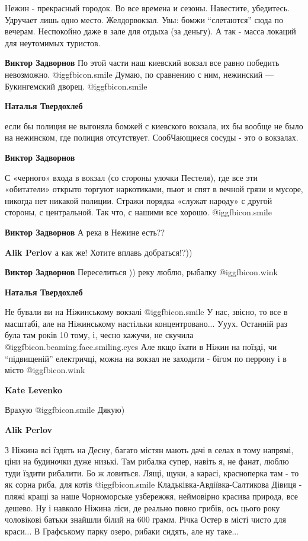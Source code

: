 \begin{itemize}
\begin{itemize}
\begin{itemize}
Нежин - прекрасный городок. Во все времена и сезоны. Навестите, убедитесь.
Удручает лишь одно место. Желдорвокзал. Увы: бомжи \enquote{слетаются} сюда по вечерам.
Неспокойно даже в зале для отдыха (за деньгу). А так - масса локаций для
неутомимых туристов.

\textbf{Виктор Задворнов} По этой части наш киевский вокзал все равно победить невозможно.  @igg{fbicon.smile} Думаю, по сравнению с ним, нежинский — Букингемский дворец.  @igg{fbicon.smile} 

\textbf{Наталья Твердохлеб} 

если бы полиция не выгоняла бомжей с киевского вокзала, их бы вообще не было на
нежинском, где полиция отсутствует. СообЧающиеся сосуды - это о вокзалах.

\textbf{Виктор Задворнов} 

С «черного» входа в вокзал (со стороны улочки Пестеля), где все эти «обитатели»
открыто торгуют наркотиками, пьют и спят в вечной грязи и мусоре, никогда нет
никакой полиции. Стражи порядка «служат народу» с другой стороны, с
центральной. Так что, с нашими все хорошо. @igg{fbicon.smile} 

\textbf{Виктор Задворнов} А река в Нежине есть??

\textbf{Alik Perlov} а как же! Хотите вплавь добраться!?))

\textbf{Виктор Задворнов} Переселиться )) реку люблю, рыбалку @igg{fbicon.wink} 

\textbf{Наталья Твердохлеб} 

Не бували ви на Ніжинському вокзалі  @igg{fbicon.smile}  У нас, звісно, то все
в масштабі, але на Ніжинському настільки концентровано... Ууух. Останній раз
була там років 10 тому, і, чесно кажучи, не скучила
@igg{fbicon.beaming.face.smiling.eyes}  Але якщо їхати в Ніжин на поїзді, чи
\enquote{підвищеній} електричці, можна на вокзал не заходити - бігом по перрону
і в місто  @igg{fbicon.wink} 

\textbf{Kate Levenko} 

Врахую @igg{fbicon.smile}
Дякую)

\textbf{Alik Perlov} 

З Ніжина всі їздять на Десну, багато містян мають дачі в селах в тому напрямі,
ціни на будиночки дуже низькі. Там рибалка супер, навіть я, не фанат, люблю
туди їздити рибалити. Бо ж ловиться. Лящі, щуки, а карасі, красноперка там - то
як сорна риба, для котів  @igg{fbicon.smile}  Кладьківка-Авдіївка-Салтикова Дівиця - пляжі кращі
за наше Чорноморське узбережжя, неймовірно красива природа, все дешево. Ну і
навколо Ніжина ліси, де реально повно грибів, ось цього року чоловікові батьки
знайшли білий на 600 грамм. Річка Остер в місті чисто для краси... В Графському
парку озеро, рибаки сидять, але ну таке...



\end{itemize}
\end{itemize}
\end{itemize}
